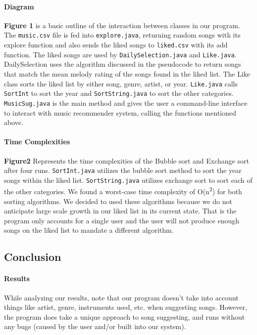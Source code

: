 \documentclass[]{article}
\let\oldparagraph\paragraph
\renewcommand{\paragraph}[1]{\oldparagraph{#1}\mbox{}}
\begin{document}
\paragraph{Diagram}\label{diagram}

\textbf{Figure 1} is a basic outline of the interaction between classes
in our program. The \texttt{music.csv} file is fed into
\texttt{explore.java}, returning random songs with its explore function
and also sends the liked songs to \texttt{liked.csv} with its add
function. The liked songs are used by \texttt{DailySelection.java} and
\texttt{Like.java}. DailySelection uses the algorithm discussed in the
pseudocode to return songs that match the mean melody rating of the
songs found in the liked list. The Like class sorts the liked list by
either song, genre, artist, or year. \texttt{Like.java} calls
\texttt{SortInt} to sort the year and \texttt{SortString.java} to sort
the other categories. \texttt{MusicSug.java} is the main method and
gives the user a command-line interface to interact with music
recommender system, calling the functions mentioned above.

\paragraph{Time Complexities}\label{time-complexities}

\textbf{Figure2} Represents the time complexities of the Bubble sort and
Exchange sort after four runs. \texttt{SortInt.java} utilizes the bubble
sort method to sort the year songs within the liked list.
\texttt{SortString.java} utilizes exchange sort to sort each of the
other categories. We found a worst-case time complexity of
O(n\textsuperscript{2}) for both sorting algorithms. We decided to used
these algorithms because we do not anticipate large scale growth in our
liked list in its current state. That is the program only accounts for a
single user and the user will not produce enough songs on the liked list
to mandate a different algorithm.

\subsection{Conclusion}\label{conclusion}

\paragraph{Results}\label{results}

While analyzing our results, note that our program doesn't take into
account things like artist, genre, instruments used, etc. when
suggesting songs. However, the program does take a unique approach to
song suggesting, and runs without any bugs (caused by the user and/or
built into our system).
\end{document}
